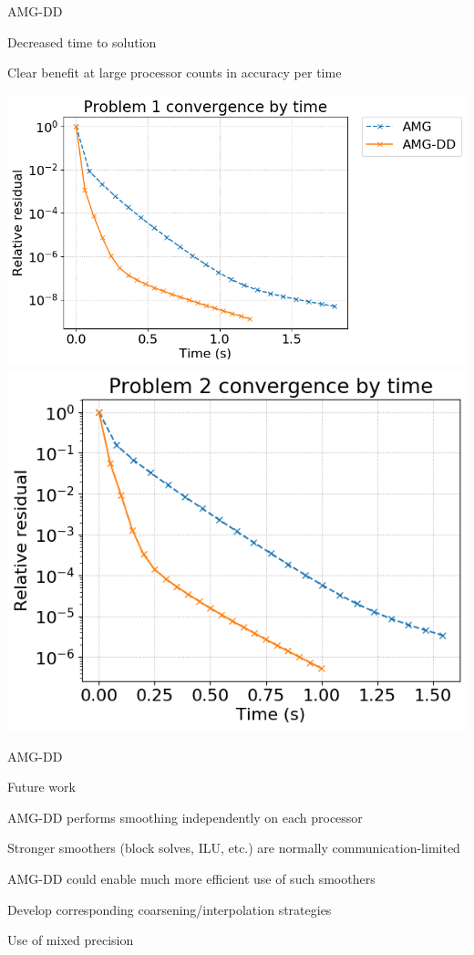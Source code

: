 \documentclass[18pt,xcolor=table]{beamer}
\begin{document}
\begin{frame}{AMG-DD}
\begin{block}{Decreased time to solution}
\bit
\item Clear benefit at large processor counts in accuracy per time
\eit
\end{block}
\centering
\vspace{0.5 cm}
\includegraphics[height=0.3\textwidth]{../figures/resConvByTimeProblem1}
\includegraphics[height=0.3\textwidth]{../figures/resConvByTimeProblem2}
\end{frame}

\begin{frame}{AMG-DD}
\begin{block}{Future work}
\bit
\item AMG-DD performs smoothing independently on each processor
\bit
\item Stronger smoothers (block solves, ILU, etc.) are normally communication-limited
\item AMG-DD could enable much more efficient use of such smoothers
\eit
\item Develop corresponding coarsening/interpolation strategies 
\item Use of mixed precision
\eit
\end{block}
\end{frame}

\end{document}
